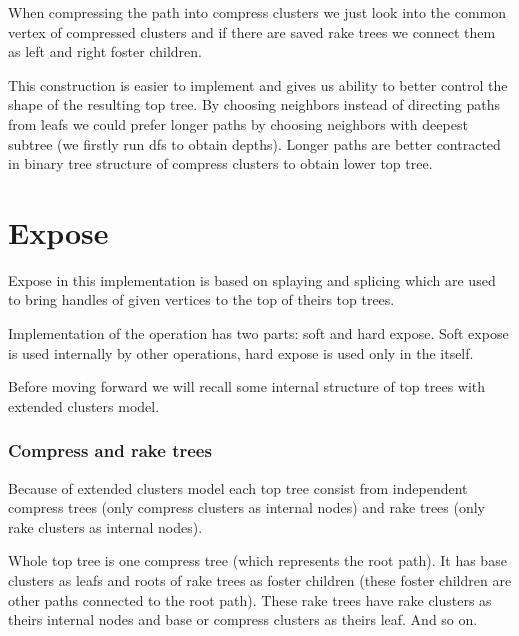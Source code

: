 When compressing the path into compress clusters we just look into the common
vertex of compressed clusters and if there are saved rake trees we connect them
as left and right foster children.

This construction is easier to implement and gives us ability to better control
the shape of the resulting top tree. By choosing neighbors instead of directing
paths from leafs we could prefer longer paths by choosing neighbors with deepest
subtree (we firstly run \gls{dfs} to obtain depths). Longer paths are better
contracted in binary tree structure of compress clusters to obtain lower top
tree.

\section{Expose}

Expose in this implementation is based on splaying and splicing which are used
to bring handles of given vertices to the top of theirs top trees.

Implementation of the \Expose{} operation has two parts: soft and hard expose. Soft
expose is used internally by other operations, hard expose is used only in the
\Expose{} itself.

Before moving forward we will recall some internal structure of top trees with
extended clusters model.


\subsubsection{Compress and rake trees}

Because of extended clusters model each top tree consist from independent
{\I compress trees} (only compress clusters as internal nodes) and
{\I rake trees} (only rake clusters as internal nodes).

Whole top tree is one compress tree (which represents the {\I root path}). It
has base clusters as leafs and roots of rake trees as foster children (these
foster children are other paths connected to the root path). These rake trees
have rake clusters as theirs internal nodes and base or compress clusters as
theirs leaf. And so on.

